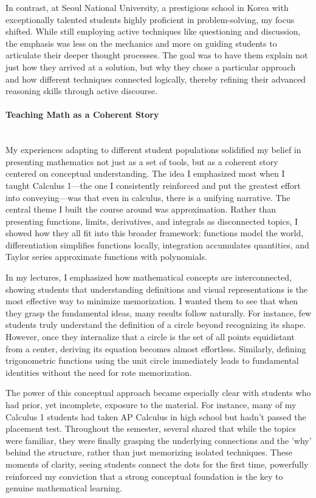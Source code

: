\documentclass[11pt]{article}
\begin{document}
In contrast, at Seoul National University, a prestigious school in Korea with exceptionally talented students highly proficient in problem-solving, my focus shifted. While still employing active techniques like questioning and discussion, the emphasis was less on the mechanics and more on guiding students to articulate their deeper thought processes. The goal was to have them explain not just how they arrived at a solution, but why they chose a particular approach and how different techniques connected logically, thereby refining their advanced reasoning skills through active discourse.

\paragraph{Teaching Math as a Coherent Story} \quad \\
My experiences adapting to different student populations solidified my belief in presenting mathematics not just as a set of tools, but as a coherent story centered on conceptual understanding. The idea I emphasized most when I taught Calculus 1—the one I consistently reinforced and put the greatest effort into conveying—was that even in calculus, there is a unifying narrative. The central theme I built the course around was approximation. Rather than presenting functions, limits, derivatives, and integrals as disconnected topics, I showed how they all fit into this broader framework: functions model the world, differentiation simplifies functions locally, integration accumulates quantities, and Taylor series approximate functions with polynomials.

In my lectures, I emphasized how mathematical concepts are interconnected, showing students that understanding definitions and visual representations is the most effective way to minimize memorization. I wanted them to see that when they grasp the fundamental ideas, many results follow naturally. For instance, few students truly understand the definition of a circle beyond recognizing its shape. However, once they internalize that a circle is the set of all points equidistant from a center, deriving its equation becomes almost effortless. Similarly, defining trigonometric functions using the unit circle immediately leads to fundamental identities without the need for rote memorization.

The power of this conceptual approach became especially clear with students who had prior, yet incomplete, exposure to the material. For instance, many of my Calculus 1 students had taken AP Calculus in high school but hadn't passed the placement test. Throughout the semester, several shared that while the topics were familiar, they were finally grasping the underlying connections and the 'why' behind the structure, rather than just memorizing isolated techniques. These moments of clarity, seeing students connect the dots for the first time, powerfully reinforced my conviction that a strong conceptual foundation is the key to genuine mathematical learning.
\end{document}
